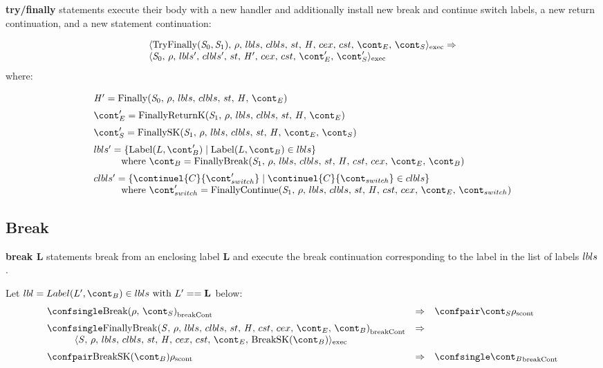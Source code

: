 \documentclass{article}
\begin{document}
\noindent
\textbf{try/finally} statements execute their body with a new handler and additionally install new break and continue switch labels, a new return continuation, and a new statement continuation:

\[
  \begin{array}{lcl}
	\execconf{\mathrm{TryFinally}(\stmti{0}, \stmti{1})}{\env}{\lbls}{\clbls}{\handler}{\cex}{\cstrace}{\econt}{\scont}
	\Rightarrow\\
	\execconf{\stmti{0}}{\env}{\lbls'}{\clbls'}{\handler'}{\cex}{\cstrace}{\econt'}{\scont'}
	  \end{array}
\]
where:

\[
  \begin{array}{lcl}
	\handler' = \FinallyK{\stmti{0}}\hspace{50mm}\\[2mm]

	\econt' = \FinallyReturnK{\stmti{1}}\\[2mm]

	\scont' = \FinallySK{\stmti{1}}\\[2mm]

	\lbls' = \lbrace \mathrm{Label}(L, \bcont') \mid \mathrm{Label}(L, \bcont) \in \lbls\rbrace \\
	\hspace{10mm}\textrm{where } \bcont = \FinallyBreak{\stmti{1}}{\bcont}\\[2mm]
	\clbls' =  \lbrace \continuel{C}{\switchcont'} \mid  \continuel{C}{\switchcont} \in \clbls\rbrace\\
	\hspace{10mm}\textrm{where } \switchcont' = \FinallyContinue{\stmti{1}}{\switchcont}

  \end{array}
\]
\subsection{Break}
\textbf{break L} statements break from an enclosing label \textbf{L} and execute the break continuation corresponding to the label in the list of labels $lbls$.

Let $\lbl = Label(L', \bcont) \in \lbls \textrm{ with } L' == \mathbf{L}$ below:
\[
  \begin{array}{lcl}
	\breakconf{\Break{\env}{\scont}}
	& \Rightarrow &
	\scontconf{\scont}{\env}\\[2mm]

	\breakconf{\FinallyBreak{\stmt}{\bcont}}
	& \Rightarrow \\
	\hspace{10mm}\execconf{\stmt}{\env}{\lbls}{\clbls}{\handler}{\cex}{\cstrace}{\econt}{\mathrm{BreakSK}(\bcont)}\\[2mm]

	\scontconf{\mathrm{BreakSK}(\bcont)}{\env}
	& \Rightarrow &
	\breakconf{\bcont}

  \end{array}
\]
\end{document}
